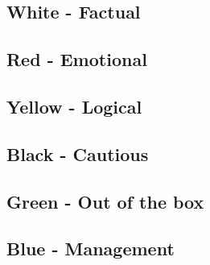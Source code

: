 \subsection{White - Factual}
\subsection{Red - Emotional}
\subsection{Yellow - Logical}
\subsection{Black - Cautious}
\subsection{Green - Out of the box}
\subsection{Blue - Management}